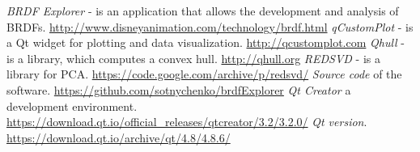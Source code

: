 \documentclass{article}
\begin{document}
\begin{thebibliography}{9}
 \emph{BRDF Explorer} - is an application that allows the development and analysis of BRDFs. \url{http://www.disneyanimation.com/technology/brdf.html} 
 \emph{qCustomPlot} - is a Qt  widget for plotting and data visualization. \url{http://qcustomplot.com} 
 \emph{Qhull} - is a library, which computes a convex hull. \url{http://qhull.org} 
 \emph{REDSVD} - is a library for PCA. \url{https://code.google.com/archive/p/redsvd/}
 \emph{Source code}  of the software. \url{https://github.com/sotnychenko/brdfExplorer}
 \emph{Qt Creator}  a development environment. \url{https://download.qt.io/official_releases/qtcreator/3.2/3.2.0/}
 \emph{Qt version}. \url{https://download.qt.io/archive/qt/4.8/4.8.6/}


\end{thebibliography}
\end{document}
